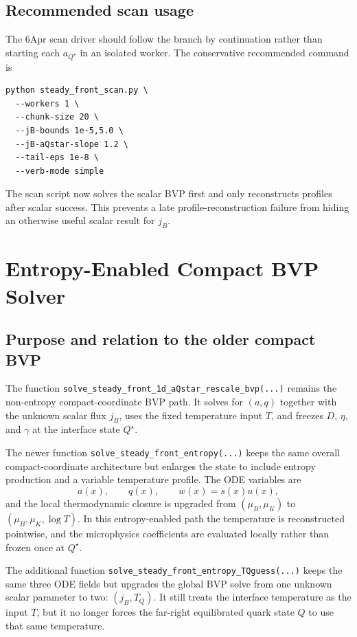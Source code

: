 \documentclass[11pt]{article}
\begin{document}
\subsection{Recommended scan usage}
The 6Apr scan driver should follow the branch by continuation rather than
starting each $a_{Q^\star}$ in an isolated worker. The conservative recommended
command is
\begin{verbatim}
python steady_front_scan.py \
  --workers 1 \
  --chunk-size 20 \
  --jB-bounds 1e-5,5.0 \
  --jB-aQstar-slope 1.2 \
  --tail-eps 1e-8 \
  --verb-mode simple
\end{verbatim}
The scan script now solves the scalar BVP first and only reconstructs profiles
after scalar success. This prevents a late profile-reconstruction failure from
hiding an otherwise useful scalar result for $j_B$.

\clearpage
\section{Entropy-Enabled Compact BVP Solver}
\subsection{Purpose and relation to the older compact BVP}
The function
\texttt{solve\_steady\_front\_1d\_aQstar\_\allowbreak rescale\_bvp(...)}
remains the non-entropy compact-coordinate BVP path. It solves for
$(a,q)$ together with the unknown scalar flux $j_B$, uses the fixed
temperature input $T$, and freezes $D$, $\eta$, and $\gamma$ at the
interface state $Q^\star$.

The newer function \texttt{solve\_steady\_front\_entropy(...)} keeps the same
overall compact-coordinate architecture but enlarges the state to include
entropy production and a variable temperature profile. The ODE variables are
\begin{equation}
a(x),\qquad q(x),\qquad w(x)=s(x)u(x),
\end{equation}
and the local thermodynamic closure is upgraded from
$(\mu_B,\mu_K)$ to $(\mu_B,\mu_K,\log T)$. In this entropy-enabled path the
temperature is reconstructed pointwise, and the microphysics coefficients are
evaluated locally rather than frozen once at $Q^\star$.

The additional function \texttt{solve\_steady\_front\_entropy\_TQguess(...)}
keeps the same three ODE fields but upgrades the global BVP solve from one
unknown scalar parameter to two: $(j_B,T_Q)$. It still treats the interface
temperature as the input $T$, but it no longer forces the far-right
equilibrated quark state $Q$ to use that same temperature.
\end{document}
